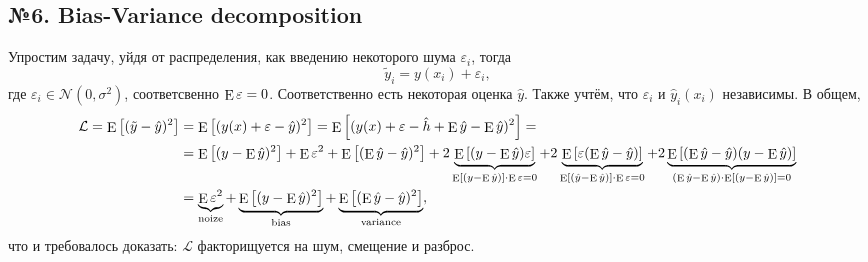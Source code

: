 \subsection*{№6. Bias-Variance decomposition}

Упростим задачу, уйдя от распределения, как введению некоторого шума $\varepsilon_i$, тогда
\begin{equation*}
    \tilde{y}_i = y(x_i) + \varepsilon_i,
\end{equation*}
где $\varepsilon_i \in \mathcal N(0, \sigma^2)$, соответсвенно $\E \varepsilon = 0$. Соответственно есть некоторая оценка $\hat{y}$. Также учтём, что $\varepsilon_i$ и $\hat{y}_i (x_i)$  независимы. В общем, 
\begin{align*}
    \mathcal L = \E\left[
        (\tilde{y} - \hat{y})^2
    \right] &= \E\left[
        (y(x) + \varepsilon - \hat{y})^2
    \right] = 
    \E\left[
        (
            y(x) + \varepsilon - \hat{h} + \E \hat{y} - \E \hat{y}
        )^2
    \right] = \\
    &= \E\left[
        (y - \E \hat{y})^2
    \right] + \E \varepsilon^2 + 
    \E \left[
        (\E \hat{y} - \hat{y})^2
    \right] + 2\underbrace{ \E \left[
        (y - \E \hat{y}) \varepsilon
    \right]}_{\E \left[(y - \E \hat{y})\right] \cdot \E \varepsilon = 0} + 
    2 \underbrace{\E\left[
        \varepsilon (\E \hat{y} - \hat{y})
    \right]}_{\E \left[(\hat{y} - \E \hat{y})\right] \cdot \E \varepsilon = 0} + 
    2 \underbrace{\E \left[
        (\E \hat{y} - \hat{y})(y - \E \hat{y})
    \right]}_{(\E \hat{y} - \E \hat{y}) \cdot \E \left[(y - \E \hat{y})\right]= 0}
    \\
    &= \underbrace{\E \varepsilon^2}_{\text{noize}} + \underbrace{\E \left[
         (y - \E \hat{y})^2
    \right]}_{\text{bias}} + \underbrace{\E \left[
        (\E \hat{y} - \hat{y})^2
    \right]}_{\text{variance}},
\end{align*}
что и требовалось доказать: $\mathcal L$ факторищуется на шум, смещение и разброс. 









